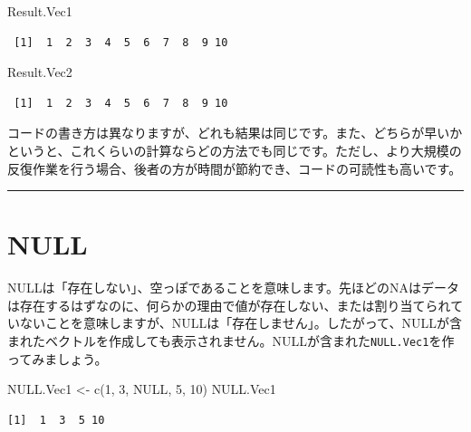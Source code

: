 \documentclass[
  a4paper,
  pandoc,
  ja=standard,
  jafont=haranoaji]{bxjsbook}
\newenvironment{Shaded}{\begin{snugshade}}{\end{snugshade}}
\newcommand{\ConstantTok}[1]{\textcolor[rgb]{0.56,0.35,0.01}{#1}}
\newcommand{\DecValTok}[1]{\textcolor[rgb]{0.68,0.00,0.00}{#1}}
\newcommand{\FunctionTok}[1]{\textcolor[rgb]{0.28,0.35,0.67}{#1}}
\newcommand{\NormalTok}[1]{\textcolor[rgb]{0.00,0.48,0.65}{#1}}
\newcommand{\OtherTok}[1]{\textcolor[rgb]{0.00,0.48,0.65}{#1}}
\begin{document}
\begin{Shaded}
\begin{Highlighting}[numbers=left,,]
\NormalTok{Result.Vec1}
\end{Highlighting}
\end{Shaded}

\begin{verbatim}
 [1]  1  2  3  4  5  6  7  8  9 10
\end{verbatim}

\begin{Shaded}
\begin{Highlighting}[numbers=left,,]
\NormalTok{Result.Vec2}
\end{Highlighting}
\end{Shaded}

\begin{verbatim}
 [1]  1  2  3  4  5  6  7  8  9 10
\end{verbatim}

コードの書き方は異なりますが、どれも結果は同じです。また、どちらが早いかというと、これくらいの計算ならどの方法でも同じです。ただし、より大規模の反復作業を行う場合、後者の方が時間が節約でき、コードの可読性も高いです。

\begin{center}\rule{0.5\linewidth}{0.5pt}\end{center}

\hypertarget{sec-type_null}{%
\section{NULL}\label{sec-type_null}}

NULLは「存在しない」、空っぽであることを意味します。先ほどのNAはデータは存在するはずなのに、何らかの理由で値が存在しない、または割り当てられていないことを意味しますが、NULLは「存在しません」。したがって、NULLが含まれたベクトルを作成しても表示されません。NULLが含まれた\texttt{NULL.Vec1}を作ってみましょう。

\begin{Shaded}
\begin{Highlighting}[numbers=left,,]
\NormalTok{NULL.Vec1 }\OtherTok{\textless{}{-}} \FunctionTok{c}\NormalTok{(}\DecValTok{1}\NormalTok{, }\DecValTok{3}\NormalTok{, }\ConstantTok{NULL}\NormalTok{, }\DecValTok{5}\NormalTok{, }\DecValTok{10}\NormalTok{)}
\NormalTok{NULL.Vec1}
\end{Highlighting}
\end{Shaded}

\begin{verbatim}
[1]  1  3  5 10
\end{verbatim}
\end{document}

